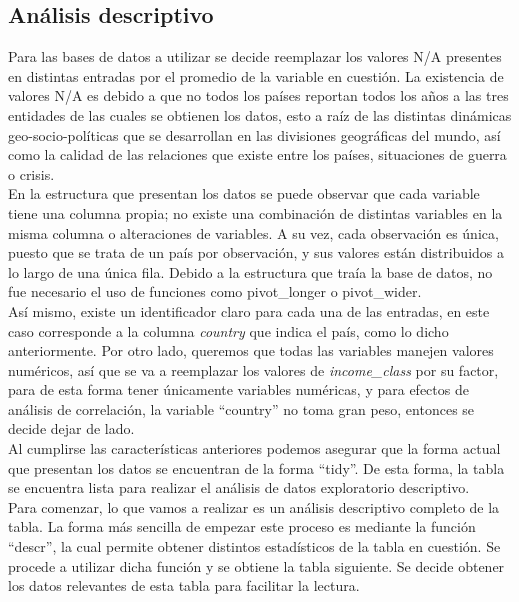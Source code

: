 \subsection{Análisis descriptivo}

Para las bases de datos a utilizar se decide reemplazar los valores N/A presentes en distintas entradas por el promedio de la variable en cuestión. La existencia de valores N/A es debido a que no todos los países reportan todos los años a las tres entidades de las cuales se obtienen los datos, esto a raíz de las distintas dinámicas geo-socio-políticas que se desarrollan en las divisiones geográficas del mundo, así como la calidad de las relaciones que existe entre los países, situaciones de guerra o crisis. \\

En la estructura que presentan los datos se puede observar que cada variable tiene una columna propia; no existe una combinación de distintas variables en la misma columna o alteraciones de variables. A su vez, cada observación es única, puesto que se trata de un país por observación, y sus valores están distribuidos a lo largo de una única fila. Debido a la estructura que traía la base de datos, no fue necesario el uso de funciones como pivot\_longer o pivot\_wider. \\

Así mismo, existe un identificador claro para cada una de las entradas, en este caso corresponde a la columna \textit{country} que indica el país, como lo dicho anteriormente. Por otro lado, queremos que todas las variables manejen valores numéricos, así que se va a reemplazar los valores de \textit{income\_class} por su factor, para de esta forma tener únicamente variables numéricas, y para efectos de análisis de correlación, la variable ``country'' no toma gran peso, entonces se decide dejar de lado.\\

Al cumplirse las características anteriores podemos asegurar que la forma actual que presentan los datos se encuentran de la forma ``tidy''. De esta forma, la tabla se encuentra lista para realizar el análisis de datos exploratorio descriptivo.\\

Para comenzar, lo que vamos a realizar es un análisis descriptivo completo de la tabla. La forma más sencilla de empezar este proceso es mediante la función ``descr'', la cual permite obtener distintos estadísticos de la tabla en cuestión. Se procede a utilizar dicha función y se obtiene la tabla siguiente. Se decide obtener los datos relevantes de esta tabla para facilitar la lectura. 

